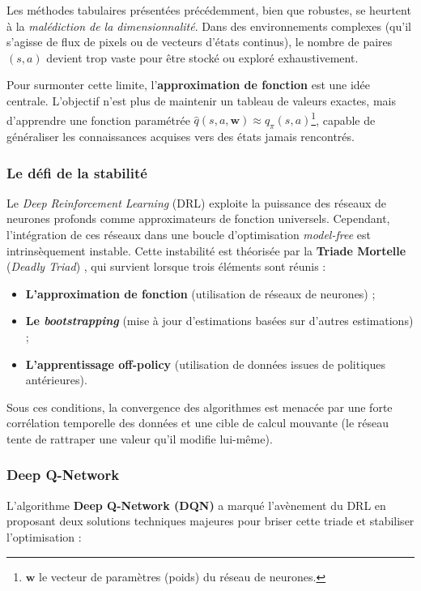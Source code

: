 Les méthodes tabulaires présentées précédemment, bien que robustes, se heurtent à la \textit{malédiction de la dimensionnalité}. Dans des environnements complexes (qu'il s'agisse de flux de pixels ou de vecteurs d'états continus), le nombre de paires $(s, a)$ devient trop vaste pour être stocké ou exploré exhaustivement. 

Pour surmonter cette limite, l'\textbf{approximation de fonction} est une idée centrale. L'objectif n'est plus de maintenir un tableau de valeurs exactes, mais d'apprendre une fonction paramétrée $\hat{q}(s, a, \mathbf{w}) \approx q_\pi(s, a)$\footnote{$\textbf{w}$ le vecteur de paramètres (poids) du réseau de neurones.}, capable de généraliser les connaissances acquises vers des états jamais rencontrés.

\subsubsection{Le défi de la stabilité}

Le \textit{Deep Reinforcement Learning} (DRL) exploite la puissance des réseaux de neurones profonds comme approximateurs de fonction universels. Cependant, l'intégration de ces réseaux dans une boucle d'optimisation \textit{model-free} est intrinsèquement instable. Cette instabilité est théorisée par la \textbf{Triade Mortelle} (\textit{Deadly Triad}) \parencite{suttonReinforcementLearningIntroduction2018}, qui survient lorsque trois éléments sont réunis :
\begin{itemize}
    \item \textbf{L'approximation de fonction} (utilisation de réseaux de neurones) ;
    \item \textbf{Le \textit{bootstrapping}} (mise à jour d'estimations basées sur d'autres estimations) ;
    \item \textbf{L'apprentissage off-policy} (utilisation de données issues de politiques antérieures).
\end{itemize}

Sous ces conditions, la convergence des algorithmes est menacée par une forte corrélation temporelle des données et une cible de calcul mouvante (le réseau tente de rattraper une valeur qu'il modifie lui-même).

\subsubsection{Deep Q-Network}
\label{sec:dqn}

L'algorithme \textbf{Deep Q-Network (DQN)} \parencite{mnihHumanlevelControlDeep2015} a marqué l'avènement du DRL en proposant deux solutions techniques majeures pour briser cette triade et stabiliser l'optimisation :

